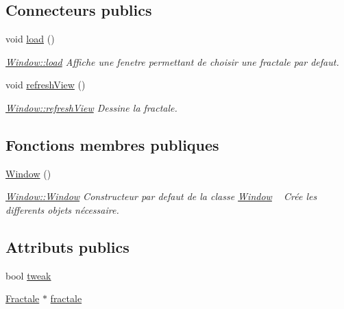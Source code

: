 \subsection*{Connecteurs publics}
\begin{DoxyCompactItemize}
\item 
void \hyperlink{class_window_a0c61ace2c0af9829fc1c66f96edf64be}{load} ()
\begin{DoxyCompactList}\small\item\em \hyperlink{class_window_a0c61ace2c0af9829fc1c66f96edf64be}{Window\+::load} Affiche une fenetre permettant de choisir une fractale par defaut. \end{DoxyCompactList}\item 
void \hyperlink{class_window_ab2babfe1d3ae399e069000309cc3a7ae}{refresh\+View} ()
\begin{DoxyCompactList}\small\item\em \hyperlink{class_window_ab2babfe1d3ae399e069000309cc3a7ae}{Window\+::refresh\+View} Dessine la fractale. \end{DoxyCompactList}\end{DoxyCompactItemize}
\subsection*{Fonctions membres publiques}
\begin{DoxyCompactItemize}
\item 
\hyperlink{class_window_a74e6087da23d3c24e9fac0245e5ec92c}{Window} ()
\begin{DoxyCompactList}\small\item\em \hyperlink{class_window_a74e6087da23d3c24e9fac0245e5ec92c}{Window\+::\+Window} Constructeur par defaut de la classe \hyperlink{class_window}{Window} ~\newline
 Crée les differents objets nécessaire. \end{DoxyCompactList}\end{DoxyCompactItemize}
\subsection*{Attributs publics}
\begin{DoxyCompactItemize}
\item 
bool \hyperlink{class_window_a52e7d4e63f98e761696b4e5e0296c053}{tweak}
\item 
\hyperlink{class_fractale}{Fractale} $\ast$ \hyperlink{class_window_a022688408d51ba601784ebfef3f8da10}{fractale}
\end{DoxyCompactItemize}
